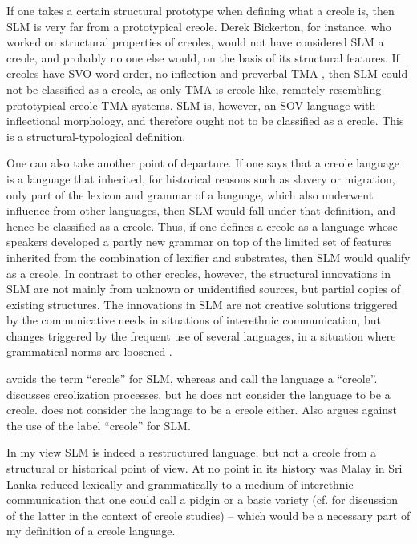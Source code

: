 If one takes a certain structural prototype when defining what a creole is, then SLM is very far from a prototypical creole. Derek Bickerton, for instance, who worked on structural properties of creoles, would not have considered SLM a creole, and probably no one else would, on the basis of its structural features. If creoles have SVO word order, no inflection and preverbal TMA \citep[292-293]{Seuren1998}, then SLM could not be classified as a creole, as only TMA is creole-like, remotely resembling prototypical creole TMA systems. SLM is, however, an SOV language with inflectional morphology, and therefore ought not to be classified as a creole. This is a structural-typological definition.

One can also take another point of departure. If one says that a creole language is a language that inherited, for historical reasons such as slavery or migration, only part of the lexicon and grammar of a language, which also underwent influence from other languages, then SLM would fall under that definition, and hence be classified as a creole. Thus, if one defines a creole as a language whose speakers developed a partly new grammar on top of the limited set of features inherited from the combination of lexifier and substrates, then SLM would qualify as a creole. In contrast to other creoles, however, the structural innovations in SLM are not mainly from unknown or unidentified sources, but partial copies of existing structures. The innovations in SLM are not creative solutions triggered by the communicative needs in situations of interethnic communication, but changes triggered by the frequent use of several languages, in a situation where grammatical norms are loosened \citep[cf.][]{Matras2009}. 

\citet{Nordhoff2009} avoids the term ``creole'' for SLM, whereas  \citet{Jayasuriya2002nusa} and  \citet{SmithEtAl2004} call the language a ``creole''. \citet{Robuchon2003} discusses creolization processes, but he does not consider the language to be a creole. \citet{Slomanson2006,Slomanson2008,Slomanson2011} does not consider the language to be a creole either. Also \citet{Ansaldo2008genesis} argues against the use of the label ``creole'' for SLM. 

In my view SLM is indeed a restructured language, but not a creole from a structural or historical point of view. At no point in its history was Malay in Sri Lanka  reduced lexically and grammatically to a medium of interethnic communication that one could call a pidgin or a basic variety (cf. \citet{BeckerEtAl2003} for discussion of the latter in the context of creole studies) -- which would be a necessary part of my definition of a creole language. 

